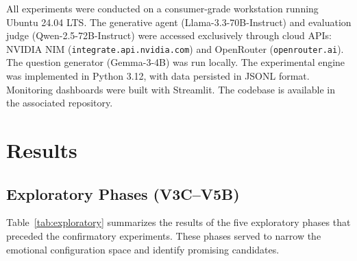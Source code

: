 \documentclass[lineno]{wlpeerj}
\begin{document}
All experiments were conducted on a consumer-grade workstation running Ubuntu 24.04 LTS. The generative agent (Llama-3.3-70B-Instruct) and evaluation judge (Qwen-2.5-72B-Instruct) were accessed exclusively through cloud APIs: NVIDIA NIM (\texttt{integrate.api.nvidia.com}) and OpenRouter (\texttt{openrouter.ai}). The question generator (Gemma-3-4B) was run locally. The experimental engine was implemented in Python 3.12, with data persisted in JSONL format. Monitoring dashboards were built with Streamlit. The codebase is available in the associated repository.

\section{Results}

\subsection{Exploratory Phases (V3C--V5B)}

Table~\ref{tab:exploratory} summarizes the results of the five exploratory phases that preceded the confirmatory experiments. These phases served to narrow the emotional configuration space and identify promising candidates.
\end{document}

